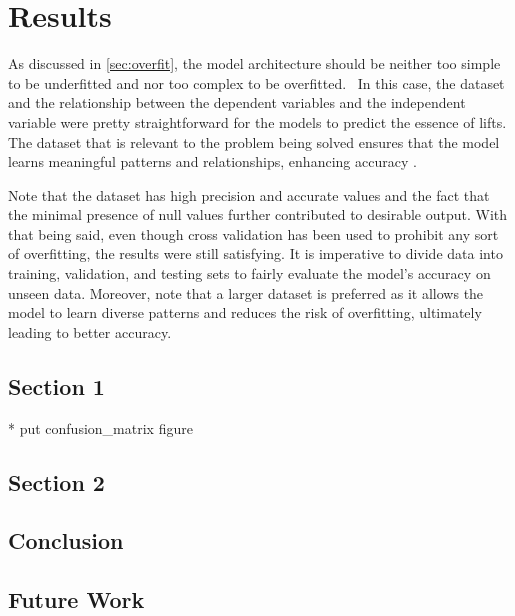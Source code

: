 %
\chapter{Results}
\label{sec:results}

As discussed in \ref{sec:overfit}, the model architecture should be neither too simple to be underfitted and nor too complex to be overfitted. 
In this case, the dataset and the relationship between the dependent variables and the independent variable were pretty straightforward for the models to predict the essence of lifts. 
The dataset that is relevant to the problem being solved ensures that the model learns meaningful patterns and relationships, enhancing accuracy
\cite{gudivada2017data}.

Note that the dataset has high precision and accurate values and the fact that the minimal presence of null values further contributed to desirable output. With that being said, even though cross validation has been used to prohibit any sort of overfitting, the results were still satisfying.
It is imperative to divide data into training, validation, and testing sets to fairly evaluate the model's accuracy on unseen data. Moreover, note that a larger dataset is preferred as it allows the model to learn diverse patterns and reduces the risk of overfitting, ultimately leading to better accuracy.





\section{Section 1}
\label{sec:results:sec1}


* put confusion\_matrix figure




\section{Section 2}
\label{sec:results:sec3}



\section{Conclusion}
\label{sec:results:conclusion}




\section{Future Work}
\label{sec:results:future}
